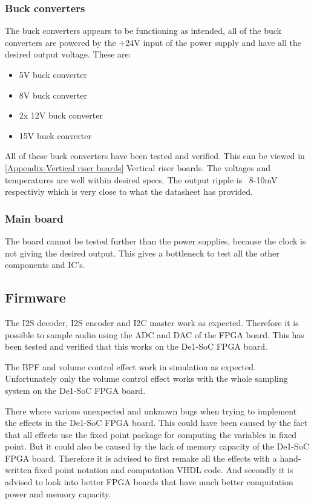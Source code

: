 \subsubsection{Buck converters}
The buck converters appears to be functioning as intended, all of the buck converters are powered by the +24V input of the power supply and have all the desired output voltage. These are:
\begin{itemize}
\item 5V buck converter
\item 8V buck converter
\item 2x 12V buck converter
\item 15V buck converter
\end{itemize}  
All of these buck converters have been tested and verified. This can be viewed in \ref{Appendix-Vertical riser boards} Vertical riser boards. The voltages and temperatures are well within desired specs. The output ripple is ~8-10mV respectivly which is very close to what the datasheet has provided. 

\subsubsection{Main board}
The board cannot be tested further than the power supplies, because the clock is not giving the desired output. This gives a bottleneck to test all the other components and IC's.

\subsection{Firmware}
The I2S decoder, I2S encoder and I2C master work as expected. Therefore it is possible to sample audio using the ADC and DAC of the FPGA board. This has been tested and verified that this works on the De1-SoC FPGA board. 

The BPF and volume control effect work in simulation as expected. Unfortunately only the volume control effect works with the whole sampling system on the De1-SoC FPGA board. 

There where various unexpected and unknown bugs when trying to implement the effects in the De1-SoC FPGA board. This could have been caused by the fact that all effects use the fixed point package for computing the variables in fixed point. But it could also be caused by the lack of memory capacity of the De1-SoC FPGA board. Therefore it is advised to first remake all the effects with a hand-written fixed point notation and computation VHDL code. And secondly it is advised to look into better FPGA boards that have much better computation power and memory capacity.